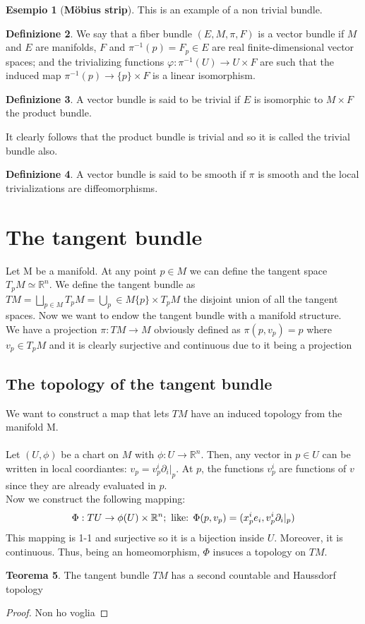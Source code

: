 \documentclass[12pt,a4paper]{report}
\theoremstyle{definition}
\newtheorem{Def}{Definizione}[chapter]
\theoremstyle{Theorem}
\newtheorem{Theo}[Def]{Teorema}
\theoremstyle{definition}
\newtheorem{Ex}[Def]{Esempio}
\theoremstyle{definition}
\theoremstyle{definition}
\begin{document}
	\begin{Ex}[\textbf{Möbius strip}]\label{Ex_1.3}
		This is an example of a non trivial bundle.
	\end{Ex}
	\begin{Def}
		We say that a fiber bundle $(E,M,\pi,F)$ is a vector bundle if $M$ and $E$ are manifolds, $F$ and $\pi^{-1}(p)=F_p\in E$ are real finite-dimensional vector spaces; and the trivializing functions $\varphi:\pi^{-1}(U)\rightarrow U\times F$ are such that the induced map $\pi^{-1}(p)\rightarrow\{p\}\times F$ is a linear isomorphism.
	\end{Def}
	\begin{Def}
		A vector bundle is said to be trivial if $E$ is isomorphic to $M\times F$ the product bundle.
	\end{Def}
	It clearly follows that the product bundle is trivial and so it is called the trivial bundle also.
	\begin{Def}
		A vector bundle is said to be smooth if $\pi$ is smooth and the local trivializations are diffeomorphisms.
	\end{Def}
	\section{The tangent bundle}
		Let M be a manifold. At any point $p\in M$ we can define the tangent space $T_pM\simeq \mathbb{R}^n$. We define the tangent bundle as $TM=\bigsqcup_{p\in M}T_pM=\bigcup_p\in M \{p\}\times T_pM$ the disjoint union of all the tangent spaces. Now we want to endow the tangent bundle with a manifold structure.\\
		We have a projection $\pi:TM\rightarrow M$ obviously defined as $\pi(p,v_p)=p$ where $v_p\in T_pM$ and it is clearly surjective and continuous due to it being a projection
		\subsection{The topology of the tangent bundle}
		We want to construct a map that lets $TM$ have an induced topology from the manifold M.\\
		\\
		Let $(U,\phi)$ be a chart on $M$ with $\phi:U\rightarrow \mathbb{R}^n$. Then, any vector in $p\in U$ can be written in local coordiantes: $v_p=v^i_p\partial_i|_p$. At $p$, the functions $v^i_p$ are functions of $v$ since they are already evaluated in $p$.\\
		Now we construct the following mapping:
		$$\Phi:TU\rightarrow \phi(U)\times \mathbb{R}^n; \hbox{ like: }
		\Phi(p,v_p)=(x^i_pe_i,v^i_p\partial_i|_p)$$
		This mapping is 1-1 and surjective so it is a bijection inside $U$. Moreover, it is continuous. Thus, being an homeomorphism, $\Phi$ insuces a topology on $TM$.
		\begin{Theo}
			The tangent bundle $TM$ has a second countable and Haussdorf topology
		\end{Theo}
		\begin{proof}
			Non ho voglia
		\end{proof}
\end{document}
